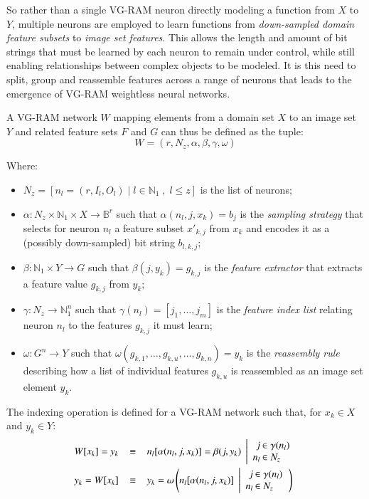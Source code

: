 \documentclass[twocolumn, 9pt]{jsproceedings}
\begin{document}
So rather than a single VG-RAM neuron directly modeling a function from \(X\) to \(Y\), multiple neurons are employed to learn functions from {\it down-sampled domain feature subsets} to {\it image set features}. This allows the length and amount of bit strings that must be learned by each neuron to remain under control, while still enabling relationships between complex objects to be modeled. It is this need to split, group and reassemble features across a range of neurons that leads to the emergence of VG-RAM weightless neural networks.

A VG-RAM network \(W\) mapping elements from a domain set \(X\) to an image set \(Y\) and related feature sets \(F\) and \(G\) can thus be defined as the tuple:
\begin{equation}
W = (r, N_z, \alpha, \beta, \gamma, \omega)
\end{equation}

Where:

\begin{itemize}
\item \(N_z = [n_l = (r, I_l, O_l) \; | \; l \in \mathbb{N}_1 \; , \; l \leq z]\) is the list of neurons;
\item \(\alpha : N_z \times \mathbb{N}_1 \times X \to \mathbb{B}^r\) such that \(\alpha(n_l, j, x_k) = b_j\) is the {\it sampling strategy} that selects for neuron \(n_l\) a feature subset \(x'_{k,j}\) from \(x_k\) and encodes it as a (possibly down-sampled) bit string \(b_{l,k,j}\);
\item \(\beta : \mathbb{N}_1 \times Y \to G\) such that \(\beta(j, y_k) = g_{k,j}\) is the {\it feature extractor} that extracts a feature value \(g_{k,j}\) from \(y_k\);
\item \(\gamma : N_z \to \mathbb{N}^{n}_1\) such that \(\gamma(n_l) = [j_1, \dotsc, j_m]\) is the {\it feature index list} relating neuron \(n_l\) to the features \(g_{k,j}\) it must learn;
\item \(\omega : G^n \to Y\) such that \(\omega(g_{k,1} , \dotsc , g_{k,u} , \dotsc , g_{k,n}) = y_k\) is the {\it reassembly rule} describing how a list of individual features \(g_{k,u}\) is reassembled as an image set element \(y_k\).
\end{itemize}

The indexing operation is defined for a VG-RAM network such that, for \(x_k \in X\) and  \(y_k \in Y\):
{ \setlength{\mathindent}{4pt}
\begin{align}
W [ x_k ] = y_k \;\;\; & \equiv \;\;\; n_l[\alpha(n_l, j, x_k)] = \beta(j, y_k) \; \left|
\begin{array}{r@{\hspace{2bp}} l}
j & \in \gamma(n_l) \\
n_l & \in N_z
\end{array}
\right. \\
y_k = W [ x_k ] \;\;\; & \equiv \;\;\; y_k = \omega\left(n_l[\alpha(n_l, j, x_k)] \; \left|
\begin{array}{r@{\hspace{2bp}} l}
j & \in \gamma(n_l) \\
n_l & \in N_z
\end{array}
\right.
\right)
\end{align}
}
\end{document}
